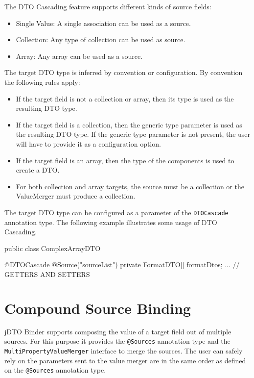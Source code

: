 \documentclass[11pt]{article}
\newcommand{\JDTO}{jDTO Binder\xspace}
\begin{document}
The DTO Cascading feature supports different kinds of source fields:

\begin{itemize}
\item Single Value: A single association can be used as a source.
\item Collection: Any type of collection can be used as source.
\item Array: Any array can be used as a source. 
\end{itemize}


The target DTO type is inferred by convention or configuration. By convention the following rules apply:


\begin{itemize}
 \item If the target field is not a collection or array, then its type is used as the resulting DTO type.
 \item If the target field is a collection, then the generic type parameter is used as the resulting DTO type. If the generic type parameter is not present, the user will have to provide it as a configuration option.
 \item If the target field is an array, then the type of the components is used to create a DTO.
 \item For both collection and array targets, the source must be a collection or the ValueMerger must produce a collection.
\end{itemize}

The target DTO type can be configured as a parameter of the \texttt{DTOCascade} annotation type. The following example illustrates some usage of DTO Cascading.


\begin{java}
 public class ComplexArrayDTO {
    
    @DTOCascade
    @Source("sourceList")
    private FormatDTO[] formatDtos;
    ... // GETTERS AND SETTERS
}
\end{java}

\section{Compound Source Binding}

\JDTO supports composing the value of a target field out of multiple sources. For this purpose it provides the \texttt{@Sources} annotation type and the \texttt{MultiPropertyValueMerger} interface to merge the sources.
The user can safely rely on the parameters sent to the value merger are in the same order as defined on the \texttt{@Sources} annotation type.
\end{document}
